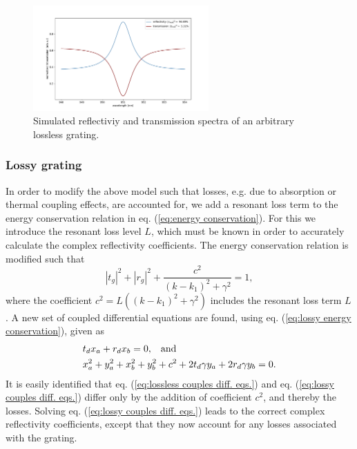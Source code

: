 \begin{figure}[h!]
    \centering
    \includegraphics[width=0.6\textwidth]{figures/grating_spectrum_lossless_example.pdf}
    \caption{Simulated reflectiviy and transmission spectra of an arbitrary lossless grating.}
    \label{fig:lossless_grating_spectrum}
\end{figure}

\subsubsection{Lossy grating}

In order to modify the above model such that losses, e.g. due to absorption or thermal coupling effects, are accounted for, we add a resonant loss term to the energy conservation relation in eq. (\ref{eq:energy conservation}). For this we introduce the resonant loss level $L$, which must be known in order to accurately calculate the complex reflectivity coefficients. The energy conservation relation is modified such that
\begin{equation}
    |t_g|^2 + |r_g|^2 + \frac{c^2}{(k - k_1)^2 + \gamma^2} = 1,
    \label{eq:lossy energy conservation}
\end{equation}
where the coefficient $c^2 = L((k-k_1)^2 + \gamma^2)$ includes the resonant loss term $L$. A new set of coupled differential equations are found, using eq. (\ref{eq:lossy energy conservation}), given as
\begin{equation}
    \begin{split}
        &t_d x_a + r_d x_b = 0, \hspace{0.3cm} \text{and} \\
        &x_a^2 + y_a^2 + x_b^2 + y_b^2 + c^2 +  2 t_d \gamma y_a + 2 r_d \gamma y_b = 0.
    \end{split}
    \label{eq:lossy couples diff. eqs.}
\end{equation}
It is easily identified that eq. (\ref{eq:lossless couples diff. eqs.}) and eq. (\ref{eq:lossy couples diff. eqs.}) differ only by the addition of coefficient $c^2$, and thereby the losses. Solving eq. (\ref{eq:lossy couples diff. eqs.}) leads to the correct complex reflectivity coefficients, except that they now account for any losses associated with the grating. 

